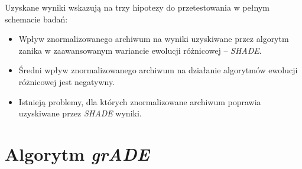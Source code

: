 \documentclass[12pt,a4paper]{report}
\begin{document}
{{{{{{\par{
Uzyskane wyniki wskazują na trzy hipotezy do przetestowania w pełnym schemacie badań:
\begin{itemize}
\item Wpływ znormalizowanego archiwum na wyniki uzyskiwane przez algorytm zanika w zaawansowanym wariancie ewolucji różnicowej -- \emph{SHADE}.
\item Średni wpływ znormalizowanego archiwum na działanie algorytmów ewolucji różnicowej jest negatywny.
\item Istnieją problemy, dla których znormalizowane archiwum poprawia uzyskiwane przez \emph{SHADE} wyniki.
\end{itemize}
}



\section{Algorytm \emph{grADE}}
}}}}}}
\end{document}
